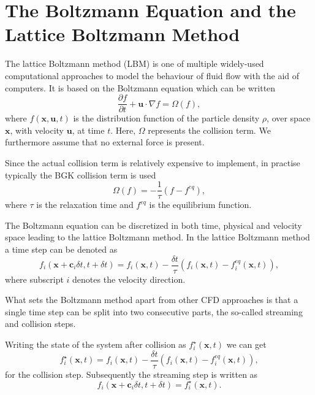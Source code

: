 \section{The Boltzmann Equation and the Lattice Boltzmann Method}\label{sec:collisionless boltzmann equation2}
The lattice Boltzmann method (LBM) is one of multiple widely-used computational approaches to model the behaviour of fluid flow with the aid of computers. It is based on the Boltzmann equation which can be written
\begin{equation}
  \frac{\partial f}{\partial t} + \mathbf{u}\cdot \nabla f = \Omega \left ( f \right ),
  \label{eq:boltzmann1}
\end{equation}
where $f(\mathbf{x},\mathbf{u},t)$ is the distribution function of the particle density $\rho$, over space $\mathbf{x}$, with velocity $\mathbf{u}$, at time $t$. Here, $\Omega$ represents the collision term. We furthermore assume that no external force is present.

Since the actual collision term is relatively expensive to implement, in practise typically the BGK collision term is used \cite{Bhatnagar1954}
\begin{equation}
    \Omega \left ( f \right ) = -\frac{1}{\tau} \left ( f - f^{eq}\right ),
\end{equation}
where $\tau$ is the relaxation time and $f^{eq}$ is the equilibrium function. 
 
The Boltzmann equation can be discretized in both time, physical and velocity space leading to the lattice Boltzmann method. In the lattice Boltzmann method a time step can be denoted as
\begin{equation}
    f_i \left ( \mathbf{x} +\mathbf{c}_i \delta t, t + \delta t \right ) = f_i \left (  \mathbf{x},t \right ) - \frac{\delta t}{\tau} \left ( f_i \left (  \mathbf{x},t \right ) - f_i^{eq}\left ( \mathbf{x} ,t \right ) \right ),
\end{equation}
where subscript $i$ denotes the velocity direction.

What sets the Boltzmann method apart from other CFD approaches is that a single time step can be split into two consecutive parts, the so-called streaming and collision steps. 

Writing the state of the system after collision as $f_i^\star \left (\mathbf{x}, t \right )$ we can get
\begin{equation}
f_i^\star \left (\mathbf{x},t \right ) = f_i \left ( \mathbf{x},t \right ) - \frac{\delta t}{\tau} \left ( f_i\left (\mathbf{x},t \right ) - f_i^{eq} \left ( \mathbf{x},t \right ) \right ),   
\end{equation}
for the collision step. Subsequently the streaming step is written as
\begin{equation}
    f_i \left ( \mathbf{x}+\mathbf{c}_i\delta t, t + \delta t \right ) = f_i^\star \left ( \mathbf{x},t \right ).
\end{equation}


